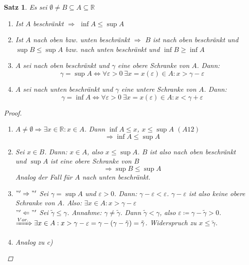 \documentclass[14pt,titlepage,ngerman,a4paper,headsepline,DIV15,halfparskip*]{scrartcl}
\newcommand{\R}{\mathbb{R}}
\theoremstyle{named}
\theoremstyle{dotless}
\newtheorem{satz}[namedtheorem]{Satz}
\begin{document}
\begin{satz} \label{1.2:satz}
	Es sei $\emptyset \neq B \subseteq A \subseteq \R$
	\begin{enumerate}
		\item Ist $A$ beschränkt $\Rightarrow$ $\inf A \leq \sup A$
		\item Ist $A$ nach oben bzw. unten beschränkt $\Rightarrow$ $B$ ist nach oben beschränkt und $\sup B \leq \sup A$ bzw. nach unten beschränkt und $\inf B \geq \inf A$
		\item $A$ sei nach oben beschränkt und $\gamma$ eine obere Schranke von $A$. Dann:
			$$
				\gamma = \sup A \iff \forall \varepsilon > 0 ~\exists x = x(\varepsilon) \in A : x > \gamma - \varepsilon
			$$
		\item $A$ sei nach unten beschränkt und $\gamma$ eine untere Schranke von $A$. Dann:
			$$
				\gamma = \inf A \iff \forall \varepsilon > 0 ~\exists x = x(\varepsilon) \in A : x < \gamma + \varepsilon
			$$	
	\end{enumerate}

	\begin{proof} ~\ 
		\begin{enumerate}
			\item $A \neq \emptyset \Rightarrow \exists x \in \R : x \in A$. Dann $\inf A \leq x$, $x \leq \sup A$ $(A12)$
			$$ \Rightarrow \inf A \leq \sup A $$
			\item Sei $x \in B$. Dann: $x \in A$, also $x \leq \sup A$. $B$ ist also nach oben beschränkt und $\sup A$ ist eine obere Schranke von $B$
			$$ \Rightarrow \sup B \leq \sup A $$
			Analog der Fall für $A$ nach unten beschränkt.
			\item $"'\Rightarrow"'$ Sei $\gamma = \sup A$ und $\varepsilon > 0$. Dann: $\gamma - \varepsilon < \varepsilon$. $\gamma - \varepsilon$ ist also keine obere Schranke von $A$. Also: $\exists x \in A : x > \gamma - \varepsilon$ \\
				$"'\Leftarrow"'$ Sei $\tilde{\gamma} \leq \gamma$. Annahme: $\gamma \neq \tilde{\gamma}$. Dann $\tilde{\gamma} < \gamma$, also $\varepsilon \coloneqq \gamma - \tilde{\gamma} > 0$.\\
				$\xRightarrow[]{Vor.} \exists x \in A: x > \gamma - \varepsilon = \gamma- (\gamma - \tilde{\gamma}) = \tilde{\gamma}$. Widerspruch zu $x \leq \tilde{\gamma}$.
			\item Analog zu c)
		\end{enumerate}
	\end{proof}
\end{satz}
\end{document}
